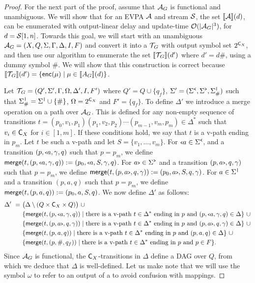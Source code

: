 \begin{proof}
	For the next part of the proof, assume that $\mathcal{A}_G$ is functional and unambiguous. We will show that for an EVPA $\mathcal{A}$ and stream $\mathcal{S}$, the set $\llbracket \mathcal{A} \rrbracket(d)$, can be enumerated with output-linear delay and update-time $\mathcal{O}(\vert\mathcal{A}_G\vert^3)$, for $d = \mathcal{S}[1,n]$. Towards this goal, we will start with an unambiguous $\mathcal{A}_G = (X,Q,\Sigma,\Gamma,\Delta,I,F)$ and convert it into a \vpann $\mathcal{T}\!_G$ with output symbol set $2^{\textsf{C}_{X}}$, and then use our algorithm to enumerate the set $\llbracket \mathcal{T}\!_G \rrbracket(d')$ where $d' = d\#$, using a dummy symbol $\#$.
	We will show that this construction is correct because $\llbracket \mathcal{T}\!_G \rrbracket(d') = \{\textsf{enc}(\mu)\mid \mu\in{\llbracket{A_G}\rrbracket}(d)\}$.
	
	Let $\mathcal{T}\!_G = (Q', \Sigma', \Gamma, \Omega, \Delta', I, F')$ 
	where $Q' = Q\cup\{q_f\}$, 
	$\Sigma' = (\Sigma^{\texttt{<}},\Sigma^{\texttt{>}},\Sigma^{\texttt{|}}_{\#})$ 
	such that $\Sigma^{\texttt{|}}_{\#} = \Sigma^{\texttt{|}}\cup\{\#\}$, $\Omega = 2^{\textsf{C}_{X}}$ and $F' = \{q_f\}$. 
	To define $\Delta'$ we introduce a {\sf merge} operation on a path over $\mathcal{A}_G$. 
	This is defined for any non-empty sequence of transitions $t = (p_0,v_1,p_1)(p_1,v_2,p_2)\cdots(p_{m-1},v_m,p_m)\in\Delta^*$ such that $v_i\in\textsf{C}_{X}$ for $i\in[1,m]$.
	If these conditions hold, we say that $t$ is a v-path ending in $p_m$. 
	Let $t$ be such a v-path and let $S = \{v_1,\ldots,v_m\}$. For ${\scriptsize\texttt{<}} a\in\Sigma^{\texttt{<}}$, and a transition $(p,{\scriptsize\texttt{<}} a,\gamma,q)$ such that $p = p_m$, we define ${\sf merge}(t, (p,{\scriptsize\texttt{<}} a,\gamma,q)) := (p_0,{\scriptsize\texttt{<}} a,S,\gamma,q)$. For $a{\scriptsize\texttt{>}}\in\Sigma^{\texttt{>}}$ and a transition $(p,a{\scriptsize\texttt{>}},q,\gamma)$ such that $p = p_m$, we define ${\sf merge}(t,(p,a{\scriptsize\texttt{>}},q,\gamma)) := (p_0,a{\scriptsize\texttt{>}},S,q,\gamma)$. For $a\in\Sigma^{\texttt{|}}$ and a transition $(p,a,q)$ such that $p = p_m$, we define ${\sf merge}(t,(p,a,q)) := (p_0,a,S,q)$. We now define $\Delta'$ as follows:
	\begin{align*}
		\Delta' \ = \ &\big(\Delta\setminus (Q\times\varcaptures{X}\times Q)\big) \ \cup\\
		&\{{\sf merge}(t,(p,\op{a},\gamma,q))\mid\text{there is a v-path $t\in\Delta^*$ ending in $p$ and }(p,\op{a},\gamma,q)\in\Delta\}\ \cup\\
		&\{{\sf merge}(t,(p,\cl{a},q,\gamma))\mid\text{there is a v-path $t\in\Delta^*$ ending in $p$ and }(p,\cl{a},q,\gamma)\in\Delta\}\ \cup\\
		&\{{\sf merge}(t,(p,a,q))\mid\text{there is a v-path $t\in\Delta^*$ ending in $p$ and }(p,a,q)\in\Delta\}\ \cup\\
		&\{{\sf merge}(t,(p,\#,q_f))\mid\text{there is a v-path $t\in\Delta^*$ ending in $p$ and } p\in F\}.
	\end{align*}
	Since $\mathcal{A}_G$ is functional, the $\textsf{C}_{X}$-transitions in $\Delta$ define a DAG over $Q$, from which we deduce that $\Delta$ is well-defined.
	Let us make note that we will use the symbol $\omega$ to refer to an output of a \vpann to avoid confusion with mappings.
	

\end{proof}
